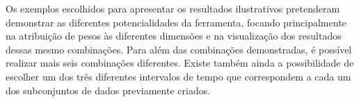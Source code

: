 Os exemplos escolhidos para apresentar os resultados ilustrativos pretenderam demonstrar as diferentes potencialidades da ferramenta, focando principalmente na atribuição de pesos às diferentes dimensões e na visualização dos resultados dessas mesmo combinações. Para além das combinações demonstradas, é possível realizar mais seis combinações diferentes. Existe também ainda a possibilidade de escolher um dos três diferentes intervalos de tempo que correspondem a cada um dos subconjuntos de dados previamente criados.


